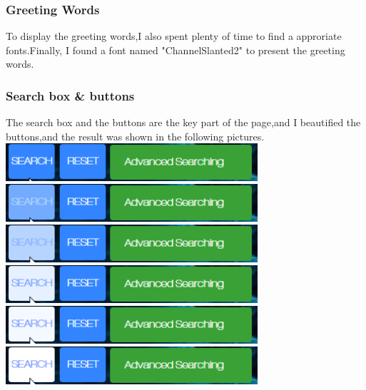 \documentclass[10pt,twoside,a4paper,titlepage]{article}
\begin{document}
	\subsubsection{Greeting Words}
	
	To display the greeting words,I also spent plenty of time to find a approriate fonts.Finally, I found a font named "ChannelSlanted2" to present the greeting words.
	
	\subsubsection{Search box \& buttons}
	
	The search box and the buttons are the key part of the page,and I beautified the buttons,and the result was shown in the following pictures.
	\newline
	\newline
	\includegraphics[width=0.7\textwidth]{cyf/search1.png}
	\newline
	\includegraphics[width=0.7\textwidth]{cyf/search2.png}
	\newline
 	\includegraphics[width=0.7\textwidth]{cyf/search3.png}
 	\newline	
 	\includegraphics[width=0.7\textwidth]{cyf/search4.png}
 	\newline	
 	\includegraphics[width=0.7\textwidth]{cyf/search5.png}
 	\newline	
 	\includegraphics[width=0.7\textwidth]{cyf/search6.png}
\end{document}
